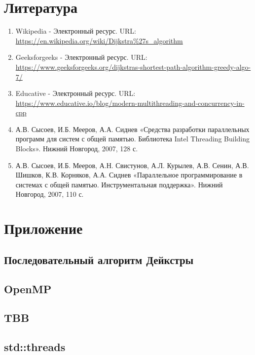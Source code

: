 \documentclass{report}
\begin{document}
\section*{Литература}
\begin{enumerate}
\item Wikipedia - Электронный ресурс. URL: \newline \url{https://en.wikipedia.org/wiki/Dijkstra%27s_algorithm}
\item Geeksforgeeks - Электронный ресурс. URL: \newline \url{https://www.geeksforgeeks.org/dijkstras-shortest-path-algorithm-greedy-algo-7/}
\item Educative - Электронный ресурс. URL: \newline \url{https://www.educative.io/blog/modern-multithreading-and-concurrency-in-cpp}
\item А.В. Сысоев, И.Б. Мееров, А.А. Сиднев «Средства разработки параллельных программ для систем с общей памятью. Библиотека Intel Threading Building Blocks». Нижний Новгород, 2007, 128 с. 
\item А.В. Сысоев, И.Б. Мееров, А.Н. Свистунов, А.Л. Курылев, А.В. Сенин, А.В. Шишков, К.В. Корняков, А.А. Сиднев «Параллельное программирование в системах с общей
памятью. Инструментальная поддержка». Нижний Новгород, 2007, 110 с. 
\end{enumerate}


\newpage

\section*{Приложение}
\subsection*{Последовательный алгоритм Дейкстры}




\subsection*{OpenMP}




\subsection*{TBB}




\subsection*{std::threads}



\end{document}
